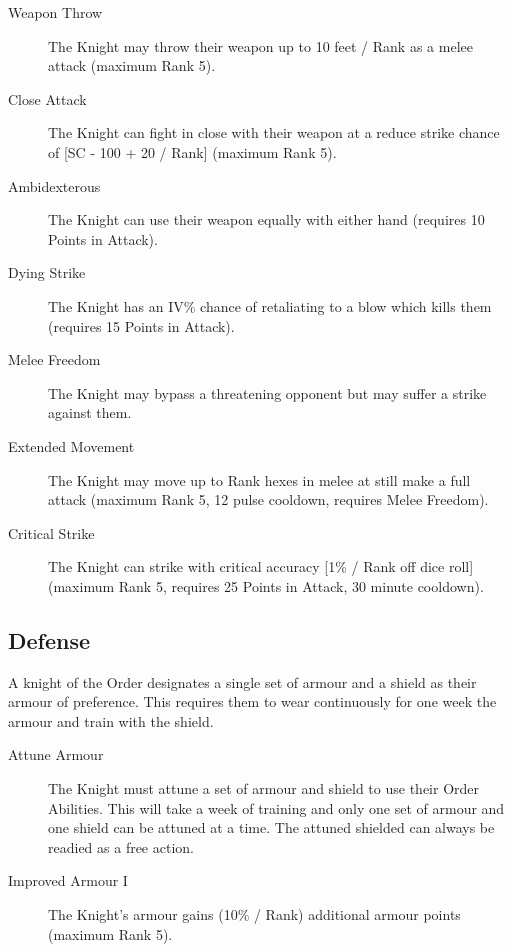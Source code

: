 \documentclass[a4paper]{article}
\begin{document}
\begin{multicols*}{3}
\begin{description}
\item[Weapon Throw] The Knight may throw their weapon up to 10 feet /
Rank as a melee attack (maximum Rank 5).

\item[Close Attack] The Knight can fight in close with their weapon at
a reduce strike chance of [SC - 100 + 20 / Rank] (maximum Rank 5).

\item[Ambidexterous] The Knight can use their weapon equally with
either hand (requires 10 Points in Attack).

\item[Dying Strike] The Knight has an IV\% chance of retaliating to a
blow which kills them (requires 15 Points in Attack).

\item[Melee Freedom] The Knight may bypass a threatening opponent but
may suffer a strike against them.

\item[Extended Movement] The Knight may move up to Rank hexes in melee
at still make a full attack (maximum Rank 5, 12 pulse cooldown,
requires Melee Freedom).

\item[Critical Strike] The Knight can strike with critical accuracy
[1\% / Rank off dice roll] (maximum Rank 5, requires 25 Points in
Attack, 30 minute cooldown).

\end{description}

\subsection{Defense}

A knight of the Order designates a single set of armour and a shield
as their armour of preference.  This requires them to wear
continuously for one week the armour and train with the shield.

\begin{description}

\item[Attune Armour] The Knight must attune a set of armour and shield
to use their Order Abilities.  This will take a week of training and
only one set of armour and one shield can be attuned at a time.  The
attuned shielded can always be readied as a free action.

\item[Improved Armour I] The Knight's armour gains (10\% / Rank)
additional armour points (maximum Rank 5).


\end{description}
\end{multicols*}
\end{document}

